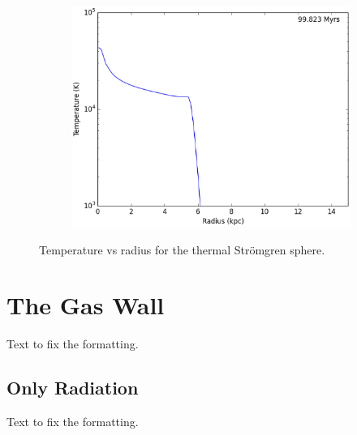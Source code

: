 \begin{figure}
\begin{subfigure}[b]{0.3\textwidth}
                \label{fig:stromgrenthermal100}
        \end{subfigure}
        ~
        \begin{subfigure}[b]{0.3\textwidth}
                \includegraphics[width=\textwidth]{graphics/ifrontThermal6400200Tempprofile.eps}
                \label{fig:stromgrenthermal500}
        \end{subfigure}
        \caption[Temperature vs radius for the thermal Str\"omgren sphere.]{Temperature vs radius for the thermal Str\"omgren sphere.}
        \label{fig:stromgrenthermal}
\end{figure}

\section{The Gas Wall}
\label{sec:gaswall}

Text to fix the formatting.

\subsection{Only Radiation}
\label{sec:gaswallradonly}

Text to fix the formatting.

